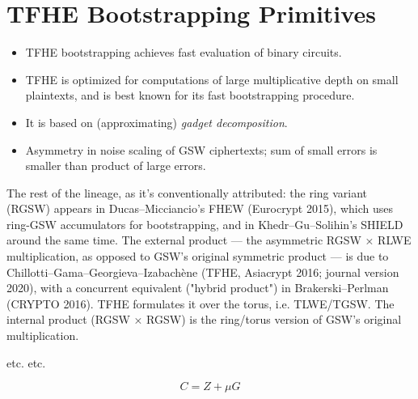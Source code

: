 \newpage


\section{TFHE Bootstrapping Primitives}


\begin{itemize}
    \item TFHE bootstrapping achieves fast evaluation of binary circuits. 
    \item TFHE is optimized for computations of large multiplicative depth on small plaintexts, and is best known for its fast bootstrapping procedure.
    \item It is based on (approximating) \textit{gadget decomposition}. 
    \item Asymmetry in noise scaling of GSW ciphertexts; sum of small errors is smaller than product of large errors.
\end{itemize}

The rest of the lineage, as it's conventionally attributed: the ring variant (RGSW) appears in Ducas–Micciancio's FHEW (Eurocrypt 2015), which uses ring-GSW accumulators for bootstrapping, and in Khedr–Gu–Solihin's SHIELD around the same time. The external product — the asymmetric RGSW × RLWE multiplication, as opposed to GSW's original symmetric product — is due to Chillotti–Gama–Georgieva–Izabachène (TFHE, Asiacrypt 2016; journal version 2020), with a concurrent equivalent ("hybrid product") in Brakerski–Perlman (CRYPTO 2016). TFHE formulates it over the torus, i.e. TLWE/TGSW. The internal product (RGSW × RGSW) is the ring/torus version of GSW's original multiplication.

\begin{definition} 
    etc. etc.

    \begin{equation}
        \label{def:rgsw}
        C = Z + \mu G
    \end{equation}
\end{definition}


